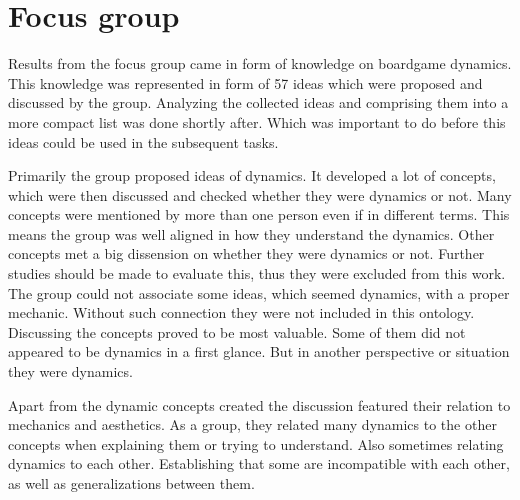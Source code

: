 \section{Focus group} 

Results from the focus group came in form of knowledge on boardgame dynamics. This knowledge was represented in form of 57 ideas which were proposed and discussed by the group. Analyzing the collected ideas and comprising them into a more compact list was done shortly after. Which was important to do before this ideas could be used in the subsequent tasks. 

Primarily the group proposed ideas of dynamics. It developed a lot of concepts, which were then discussed and checked whether they were dynamics or not. Many concepts were mentioned by more than one person even if in different terms. This means the group was well aligned in how they understand the dynamics. Other concepts met a big dissension on whether they were dynamics or not. Further studies should be made to evaluate this, thus they were excluded from this work. The group could not associate some ideas, which seemed dynamics, with a proper mechanic. Without such connection they were not included in this ontology. Discussing the concepts proved to be most valuable. Some of them did not appeared to be dynamics in a first glance. But in another perspective or situation they were dynamics.

Apart from the dynamic concepts created the discussion featured their relation to mechanics and aesthetics. As a group, they related many dynamics to the other concepts when explaining them or trying to understand. Also sometimes relating dynamics to each other. Establishing that some are incompatible with each other, as well as generalizations between them.

